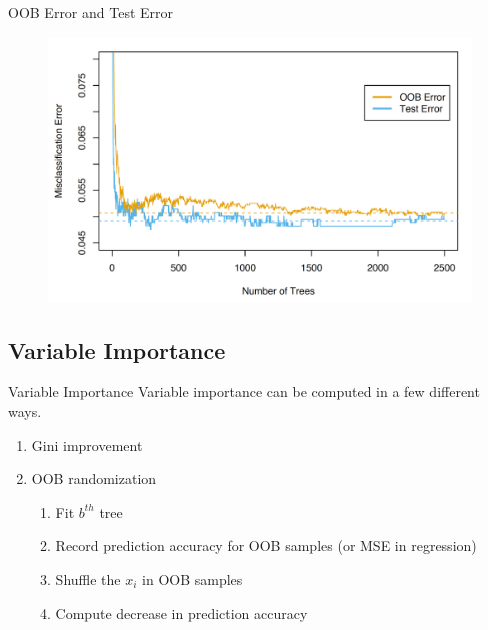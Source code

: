\documentclass[pdf]{beamer}
\begin{document}
		\begin{frame}{OOB Error and Test Error}
			\begin{figure}
				\includegraphics[scale = 0.25]{oob_error.png}
			\end{figure}		
    		\end{frame}
		
		
	\subsection{Variable Importance}
		\begin{frame}{Variable Importance}
			Variable importance can be computed in a few different ways. 
			\begin{enumerate}
				\item Gini improvement 
				\item OOB randomization
					\begin{enumerate} [  1.]
						\item Fit $b^{th}$ tree
						\item Record prediction accuracy for OOB samples (or MSE in regression)
						\item Shuffle the $x_i$ in OOB samples
						\item Compute decrease in prediction accuracy
					\end{enumerate} 
			\end{enumerate}
		\end{frame}
		
\end{document}
